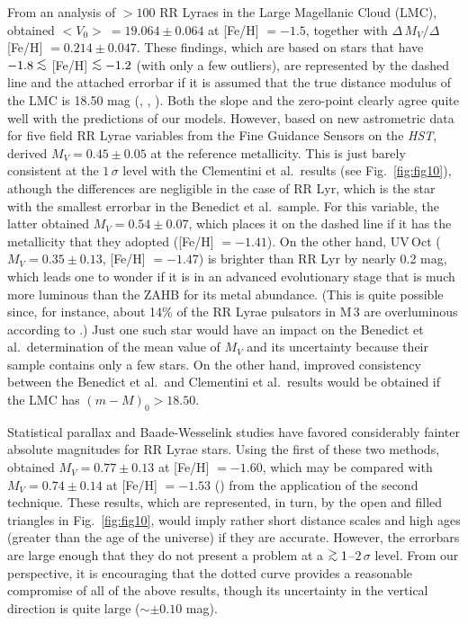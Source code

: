\documentclass[12pt,preprint]{aastex}
\newcommand\lta{\mathrel{\hbox{\raise 0.6 ex \hbox{$<$}\kern
                   -1.8 ex\lower .5 ex\hbox{$\sim$}}}}
\newcommand\gta{\mathrel{\hbox{\raise 0.6 ex \hbox{$>$}\kern
                   -1.7 ex\lower .5 ex\hbox{$\sim$}}}}
\begin{document}
From an analysis of $> 100$ RR Lyraes in the Large Magellanic Cloud (LMC),
\citet{cgb03} obtained $<$$V_0$$>\ = 19.064 \pm 0.064$ at [Fe/H] $= -1.5$,
together with $\Delta\,M_V/\Delta\,$[Fe/H] $= 0.214 \pm 0.047$.  These findings,
which are based on stars that have $-1.8 \lta$ [Fe/H] $\lta -1.2$ (with only a
few outliers), are represented by the dashed line and the attached errorbar if
it is assumed that the true distance modulus of the LMC is 18.50 mag
(\citealt{fm10}, \citealt{ljp12}, \citealt{mrm12}).  Both the
slope and the zero-point clearly agree quite well with the predictions of our
models.  However, based on new astrometric data for five field RR Lyrae
variables from the Fine Guidance Sensors on the {\it HST},
\citet[see their table 10]{bmf11} derived $M_V =
0.45 \pm 0.05$ at the reference metallicity.  This is just barely consistent at
the $1\,\sigma$ level with the Clementini et al.~results (see
Fig.~\ref{fig:fig10}), athough the differences are negligible in the case of RR
Lyr, which is the star with the smallest errorbar in the Benedict et al.~sample.
For this variable, the latter obtained $M_V = 0.54 \pm 0.07$, which places it
on the dashed line if it has the metallicity that they adopted ([Fe/H] $=
-1.41$).  On the other hand, UV$\,$Oct ($M_V = 0.35 \pm 0.13$, [Fe/H] $= -1.47$)
is brighter than RR Lyr by nearly 0.2 mag, which leads one to wonder if it is
in an advanced evolutionary stage that is much more luminous than the ZAHB for
its metal abundance.  (This is quite possible since, for instance, about 14\%
of the RR Lyrae pulsators in M$\,$3 are overluminous according to
\citealt{ccc05}.)  Just one such star would have an impact on the Benedict et
al.~determination of the mean value of $M_V$ and its uncertainty because their
sample contains only a few stars.  On the other hand, improved consistency
between the Benedict et al.~and Clementini et al.~results would be obtained if
the LMC has $(m-M)_0 > 18.50$. 

Statistical parallax and Baade-Wesselink studies have favored considerably
fainter absolute magnitudes for RR Lyrae stars.  Using the first of these two
methods, \citet{gp98} obtained $M_V = 0.77 \pm 0.13$ at [Fe/H] $= -1.60$, which
may be compared with $M_V = 0.74 \pm 0.14$ at [Fe/H] $= -1.53$ (\citealt{fbs98})
from the application of the second technique.  These results, which are
represented, in turn, by the open and filled triangles in Fig.~\ref{fig:fig10},
would imply rather short distance scales and high ages (greater than the age of
the universe) if they are accurate.  However, the errorbars are large enough
that they do not present a problem at a $\gta 1$--$2\,\sigma$ level.  From our
perspective, it is encouraging that the dotted curve provides a reasonable
compromise of all of the above results, though its uncertainty in the vertical
direction is quite large ($\sim \pm 0.10$ mag).
\end{document}

